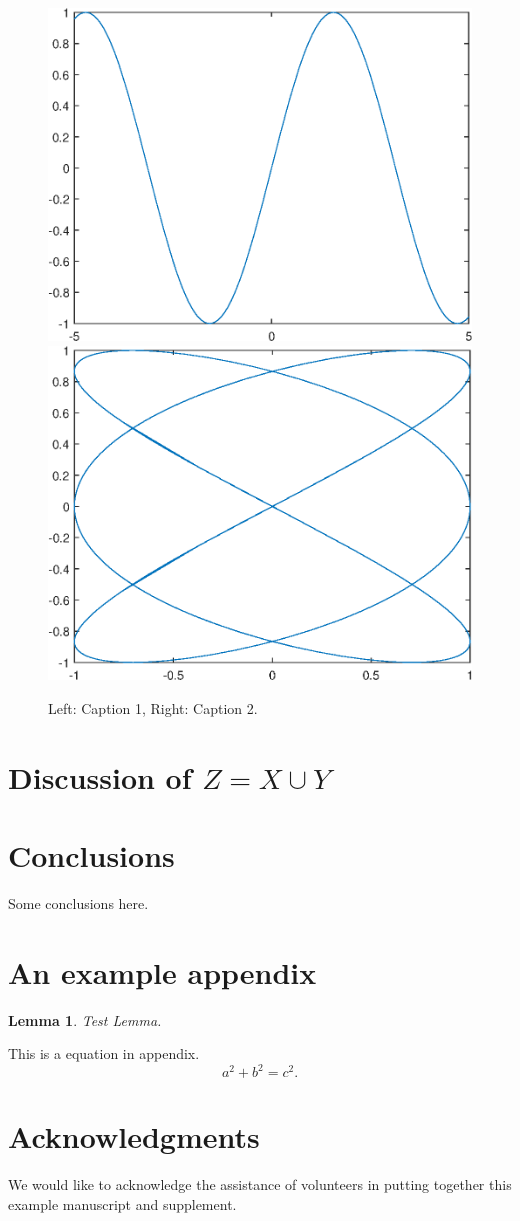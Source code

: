 \documentclass[10pt,reqno,final]{article}
\theoremstyle{plain}
\newtheorem{lemma}{Lemma}[section]
\theoremstyle{definition}
\theoremstyle{remark}
\begin{document}
\lipsum[48]

\begin{figure}[htp!]
  \centering
  \includegraphics[width=0.48\linewidth]{fig1}
  \hfill
  \includegraphics[width=0.48\linewidth]{fig2}
  \caption{Left: Caption 1, Right: Caption 2.}
  \label{fig:b}
\end{figure}


\section{Discussion of \texorpdfstring{{\boldmath$Z=X \cup Y$}}{Z = X union Y}}

\lipsum[76]

\section{Conclusions}
\label{sec:conclusions}

Some conclusions here.


\appendix
\section{An example appendix}
\lipsum[71]

\begin{lemma}
Test Lemma.
\end{lemma}

This is a equation in appendix.
\begin{equation}\label{eq:A1}
  a^2+b^2=c^2.
\end{equation}

\section*{Acknowledgments}
We would like to acknowledge the assistance of volunteers in putting
together this example manuscript and supplement.



%


\end{document}
